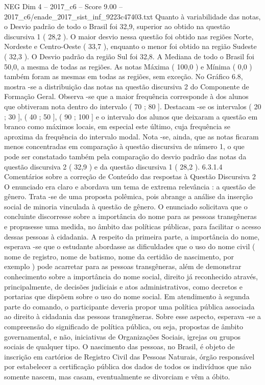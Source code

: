 \begin{textsample}{NEG Dim 4 – 2017\_c6 – Score 9.00 – 2017\_c6/enade\_2017\_sist\_inf\_9223c47403.txt}
Quanto à variabilidade das notas, o Desvio padrão de todo o Brasil foi 32,9, superior ao obtido na questão discursiva 1 ( 28,2 ).
O maior desvio nessa questão foi obtido nas regiões Norte, Nordeste e Centro-Oeste ( 33,7 ), enquanto o menor foi obtido na região Sudeste ( 32,3 ).
O Desvio padrão da região Sul foi 32,8.
A Mediana de todo o Brasil foi 50,0, a mesma de todas as regiões.
As notas Máxima ( 100,0 ) e Mínima ( 0,0 ) também foram as mesmas em todas as regiões, sem exceção.
No Gráfico 6.8, mostra -se a distribuição das notas na questão discursiva 2 do Componente de Formação Geral.
Observa -se que a maior frequência corresponde à dos alunos que obtiveram nota dentro do intervalo ( 70 ; 80 ].
Destacam -se os intervalos ( 20 ; 30 ], ( 40 ; 50 ], ( 90 ; 100 ] e o intervalo dos alunos que deixaram a questão em branco como máximos locais, em especial este último, cuja frequência se aproxima da frequência do intervalo modal.
Nota -se, ainda, que as notas ficaram menos concentradas em comparação à questão discursiva de número 1, o que pode ser constatado também pela comparação do desvio padrão das notas da questão discursiva 2 ( 32,9 ) e da questão discursiva 1 ( 28,2 ). 6.3.1.4 Comentários sobre a correção de Conteúdo das respostas à Questão Discursiva 2 O enunciado era claro e abordava um tema de extrema relevância : a questão de gênero.
Trata -se de uma proposta polêmica, pois abrange a análise da inserção social de minoria vinculada à questão de gênero.
O enunciado solicitava que o concluinte discorresse sobre a importância do nome para as pessoas transgêneras e propusesse uma medida, no âmbito das políticas públicas, para facilitar o acesso dessas pessoas à cidadania.
A respeito da primeira parte, a importância do nome, esperava -se que o estudante abordasse as dificuldades que o uso do nome civil ( nome de registro, nome de batismo, nome da certidão de nascimento, por exemplo ) pode acarretar para as pessoas transgêneras, além de demonstrar conhecimento sobre a importância do nome social, direito já reconhecido através, principalmente, de decisões judiciais e atos administrativos, como decretos e portarias que dispõem sobre o uso do nome social.
Em atendimento à segunda parte do comando, o participante deveria propor uma política pública associada ao direito à cidadania das pessoas transgêneras.
Sobre esse aspecto, esperava -se a compreensão do significado de política pública, ou seja, propostas de âmbito governamental, e não, iniciativas de Organizações Sociais, igrejas ou grupos sociais de qualquer tipo.
O nascimento das pessoas, no Brasil, é objeto de inscrição em cartórios de Registro Civil das Pessoas Naturais, órgão responsável por estabelecer a certificação pública dos dados de todos os indivíduos que não somente nascem, mas casam, eventualmente se divorciam e vêm a óbito.

\end{textsample}
